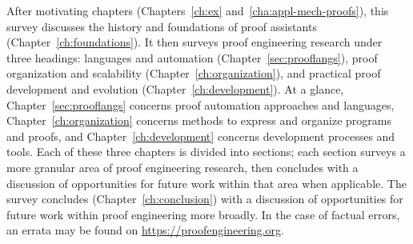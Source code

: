 After motivating chapters (Chapters~\ref{ch:ex} and~\ref{cha:appl-mech-proofs}), this survey discusses the history and foundations of 
proof assistants (Chapter~\ref{ch:foundations}). It then surveys proof engineering research under three headings: languages and automation (Chapter~\ref{sec:prooflangs}), proof organization and scalability (Chapter~\ref{ch:organization}), and practical proof development and evolution (Chapter~\ref{ch:development}).
At a glance, Chapter~\ref{sec:prooflangs} concerns proof automation approaches and languages, Chapter~\ref{ch:organization} concerns methods to express and organize programs and proofs, and Chapter~\ref{ch:development} concerns development processes and tools.
Each of these three chapters is divided into sections; each section surveys a more granular area of proof engineering research,
then concludes with a discussion of opportunities for future work within that area when applicable.
The survey concludes (Chapter~\ref{ch:conclusion}) with a discussion of opportunities for future work within proof engineering more broadly.
In the case of factual errors, an errata may be found on \url{https://proofengineering.org}.

%

